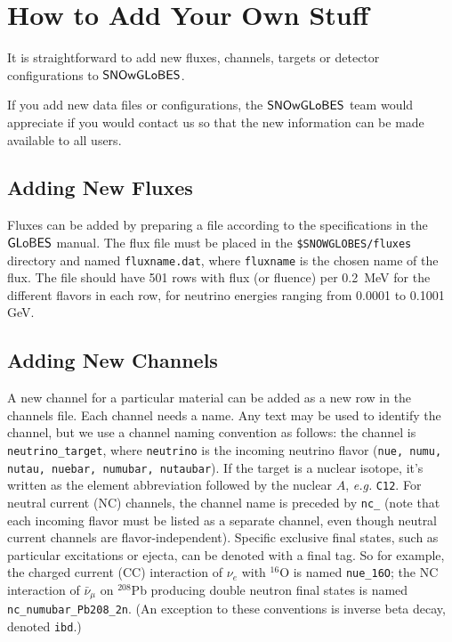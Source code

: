 \documentclass[12pt]{article}
\newcommand{\globes}{\sf{GLoBES}}
\newcommand{\snowglobes}{\sf{SNOwGLoBES}}
\begin{document}
\section{How to Add Your Own Stuff}\label{addingnew}

It is straightforward to add new fluxes, channels, targets or detector configurations to $\snowglobes$.

If you add new data files or configurations, the $\snowglobes$ team would appreciate if you would contact us so that the new information can be made available to all users.

\subsection{Adding New Fluxes}

Fluxes can be added by preparing a file according to the
specifications in the $\globes$ manual.  The flux file must be placed
in the \texttt{\$SNOWGLOBES/fluxes} directory and named
\texttt{fluxname.dat}, where \texttt{fluxname} is the chosen name
of the flux.   
The file should have 501 rows with flux (or fluence) per 0.2~MeV for the 
different flavors in each row, for neutrino energies ranging from 0.0001 to 0.1001 GeV.

\subsection{Adding New Channels}\label{addingchannel}
 A new channel for a particular material can be added as a new row in
 the channels file.  Each channel needs a name.  Any text may be used
 to identify the channel, but we use a channel naming convention as
 follows: the channel is \texttt{neutrino\_target}, where \texttt{neutrino}
 is the incoming neutrino flavor
(\texttt{nue, numu, nutau, nuebar, numubar, nutaubar}).  If the target is a nuclear isotope,
 it's written as the element abbreviation followed by the nuclear $A$,
 \textit{e.g.} \texttt{C12}.  For neutral current (NC) channels, the
 channel name is preceded by \texttt{nc\_} (note that each incoming
flavor must
 be listed as a separate channel, even though neutral current channels are
 flavor-independent).  Specific exclusive final states, such as
 particular excitations or ejecta, can be denoted with a final tag.
 So for example, the charged current (CC) interaction of $\nu_e$ with
 $^{16}$O is named \texttt{nue\_16O}; the NC
 interaction of  $\bar{\nu}_\mu$ on $^{208}$Pb producing double neutron
 final states is named \texttt{nc\_numubar\_Pb208\_2n}.  (An
 exception to these conventions is inverse beta decay, denoted
 \texttt{ibd}.)
\end{document}
